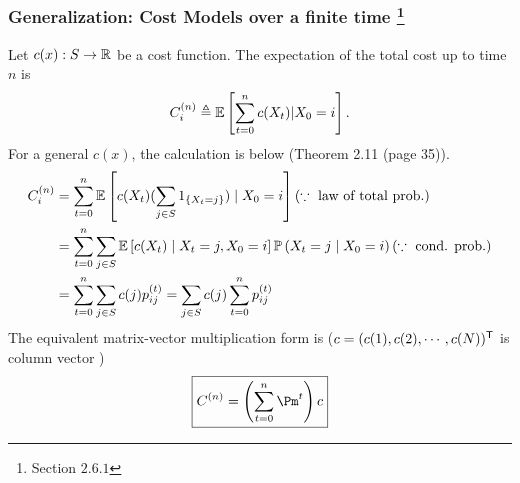 \documentclass[english,10pt]{beamer}
\begin{document}
\begin{frame}
\frametitle{Generalization:   Cost Models over a finite time \footnote{Section $2.6.1$}}

Let $c(x): S \to {\mathbb{R}}$ be a cost function. The expectation of the total cost up to time $n$ is 
\[ C_i^{(n)} \triangleq \operatorname{\mathbb E} \left[\sum_{t=0}^n c(X_t)\vert X_0=i\right]. \]
For a general $c(x)$,  the calculation    is below  (Theorem 2.11 (page 35)).
\[
\begin{split}
C_i^{(n)} &=\sum_{t=0}^n   \operatorname{\mathbb E} \left[ c(X_t) (\sum_{j\in S} 1_{\left\{X_t =j\right\}}) \mid X_0=i\right] (\because\mbox{ law of total prob.})\\
&=\sum_{t=0}^n \sum_{j\in S} \operatorname{\mathbb E} \left[ c(X_t)
\mid X_t=j, X_0=i\right]\mathbb{P} \left( X_t = j    \mid X_0=i\right) (\because\mbox{ cond. prob.})\\
&=\sum_{t=0}^n \sum_{j\in S} c(j)p^{(t)}_{ij} = 
\sum_{j\in S} c(j) \sum_{t=0}^n p^{(t)}_{ij} 
\end{split}
\]
\pause
The equivalent matrix-vector multiplication form is 
($c=(c(1),c(2),\cdots,c(N))^{\textsf{T}}$ is column vector )
 \begin{equation} \label{C}
 \boxed{
  C^{(n)} = \left ( \sum_{t=0}^n \Pm^t \right ) c}
  \end{equation}

\end{frame}


\end{document}
